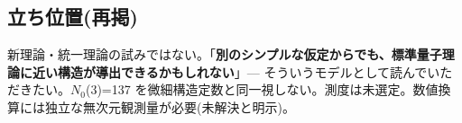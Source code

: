 \documentclass[
  10pt,
]{ltjsarticle}
\begin{document}
\subsection{立ち位置(再掲)}\label{ux7acbux3061ux4f4dux7f6eux518dux63b2}

新理論・統一理論の試みではない。「\textbf{別のシンプルな仮定からでも、標準量子理論に近い構造が導出できるかもしれない}」---
そういうモデルとして読んでいただきたい。\(N_0\)(3)=137
を微細構造定数と同一視しない。測度は未選定。数値換算には独立な無次元観測量が必要(未解決と明示)。
\end{document}
